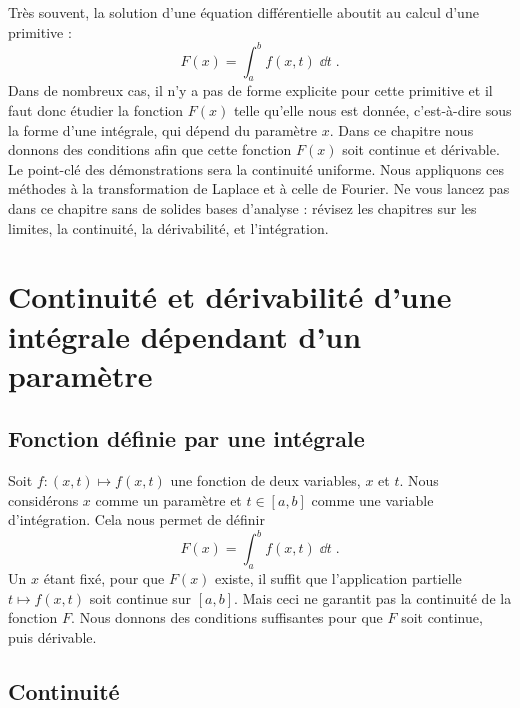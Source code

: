 \documentclass[class=report,crop=false]{standalone}
\begin{document}




Très souvent, la solution d'une équation différentielle aboutit
au calcul d'une primitive :
$$F(x) = \int_a^b f(x,t)\;\dd t\;.$$
Dans de nombreux cas, il n'y a pas de forme explicite pour cette 
primitive et il faut donc étudier la fonction $F(x)$ telle qu'elle nous est donnée, 
c'est-à-dire sous la forme d'une intégrale, qui dépend du paramètre $x$.
Dans ce chapitre nous donnons des conditions afin que cette fonction $F(x)$ soit continue
et dérivable. Le point-clé des démonstrations sera la continuité uniforme.
Nous appliquons ces méthodes à la transformation de Laplace et à celle de Fourier.
Ne vous lancez pas dans ce chapitre sans de solides bases d'analyse :
révisez les chapitres sur les limites, la continuité, la dérivabilité, 
et l'intégration.




\section{Continuité et dérivabilité d'une intégrale dépendant d'un paramètre}


\subsection{Fonction définie par une intégrale}

Soit $f : (x,t)\longmapsto f(x,t)$ une fonction de deux variables, 
$x$ et $t$. Nous considérons $x$ comme un paramètre et $t\in
[a,b]$ comme une variable d'intégration. Cela nous permet de définir
$$
F(x) = \int_a^b f(x,t)\;\dd t\;.
$$
Un $x$ étant fixé, pour que $F(x)$ existe, il suffit que l'application
partielle $t\mapsto f(x,t)$ soit continue sur $[a,b]$. Mais ceci ne
garantit pas la continuité de la fonction $F$. Nous donnons des
conditions suffisantes pour que $F$ soit continue, puis dérivable.

\subsection{Continuité}
\end{document}
